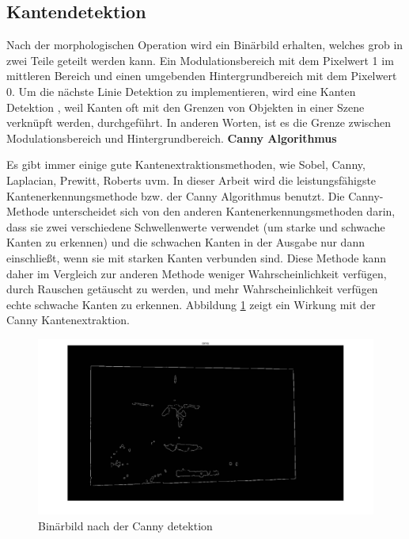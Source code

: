 \subsection{Kantendetektion}

Nach der morphologischen Operation wird ein Binärbild erhalten, welches grob in zwei Teile geteilt werden kann. Ein Modulationsbereich mit dem Pixelwert 1 im mittleren Bereich und einen umgebenden Hintergrundbereich mit dem Pixelwert 0. Um die nächste Linie Detektion zu implementieren, wird eine Kanten Detektion \cite{canny}, weil Kanten oft mit den Grenzen von Objekten in einer Szene verknüpft werden, durchgeführt. In anderen Worten, ist es die Grenze zwischen Modulationsbereich und Hintergrundbereich. 
\newpage
\textbf{Canny Algorithmus}

Es gibt immer einige gute Kantenextraktionsmethoden, wie Sobel, Canny, Laplacian, Prewitt, Roberts uvm. In dieser Arbeit wird die leistungsfähigste Kantenerkennungsmethode bzw. der Canny Algorithmus benutzt. Die Canny-Methode unterscheidet sich von den anderen Kantenerkennungsmethoden darin, dass sie zwei verschiedene Schwellenwerte verwendet (um starke und schwache Kanten zu erkennen) und die schwachen Kanten in der Ausgabe nur dann einschließt, wenn sie mit starken Kanten verbunden sind. Diese Methode kann daher im Vergleich zur anderen Methode weniger Wahrscheinlichkeit verfügen, durch Rauschen getäuscht zu werden, und mehr Wahrscheinlichkeit verfügen echte schwache Kanten zu erkennen. Abbildung \ref{fig:Binärbild nach der Canny detektion} zeigt ein Wirkung mit der Canny Kantenextraktion.

\begin{figure}[H]
 \centering 
  \includegraphics[keepaspectratio,width=1.00\textwidth]{images/4_ZweiteErfahrung/Canny/canny.pdf}
 \caption{Binärbild nach der Canny detektion}
 \label{fig:Binärbild nach der Canny detektion}
\end{figure} 

